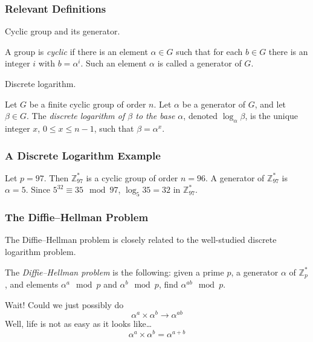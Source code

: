 \documentclass[hyperref=true]{beamer}
\begin{document}
\begin{frame}
  \frametitle{Relevant Definitions}
Cyclic group and its generator.
  \begin{definition}
    A group is \emph{cyclic} if there is an element $\alpha\in G$ such
    that for each $b\in G$ there is an integer $i$ with
    $b=\alpha^{i}$. Such an element $\alpha$ is called a generator of $G$.
  \end{definition}
Discrete logarithm.
  \begin{definition}
    Let $G$ be a finite cyclic group of order $n$. Let $\alpha$ be a
    generator of $G$, and let $\beta\in G$. The \emph{discrete
      logarithm of $\beta$ to the base $\alpha$}, denoted
    $\log_{\alpha}\beta$, is the unique integer $x$, $0\leq x\leq
    n-1$, such that $\beta=\alpha^{x}$\cite{Menezes:1996:HAC:548089}.
  \end{definition}
\end{frame}


\begin{frame}
  \frametitle{A Discrete Logarithm Example}
  \begin{example}
    Let $p=97$. Then $\mathbb{Z}_{97}^{*}$ is a cyclic group of order
    $n=96$. A generator of $\mathbb{Z}_{97}^{*}$ is $\alpha=5$. Since
    $5^{32}\equiv 35\mod 97$, $\log_{5}35 =32$ in $\mathbb{Z}_{97}^{*}$.
  \end{example}
\end{frame}

\begin{frame}
  \frametitle{The Diffie–Hellman Problem}
The Diffie–Hellman problem is closely related to the well-studied
discrete logarithm problem.
\begin{definition}
  The \emph{Diffie–Hellman problem} is the following: given a prime
  $p$, a generator $\alpha$ of $\mathbb{Z}_{p}^{*}$, and elements
  $\alpha^{a}\mod p$ and $\alpha^{b}\mod p$, find $\alpha^{ab}\mod p$.
\end{definition}
Wait! Could we just possibly do
\begin{equation}
  \label{eq:diffie–hellman-1}
  \alpha^{a}\times\alpha^{b}\rightarrow\alpha^{ab}
\end{equation}
Well, life is not as easy as it looks like\ldots
\begin{equation}
  \label{eq:diffie–hellman-2}
  \alpha^{a}\times\alpha^{b}=\alpha^{a+b}
\end{equation}

\end{frame}
\end{document}
